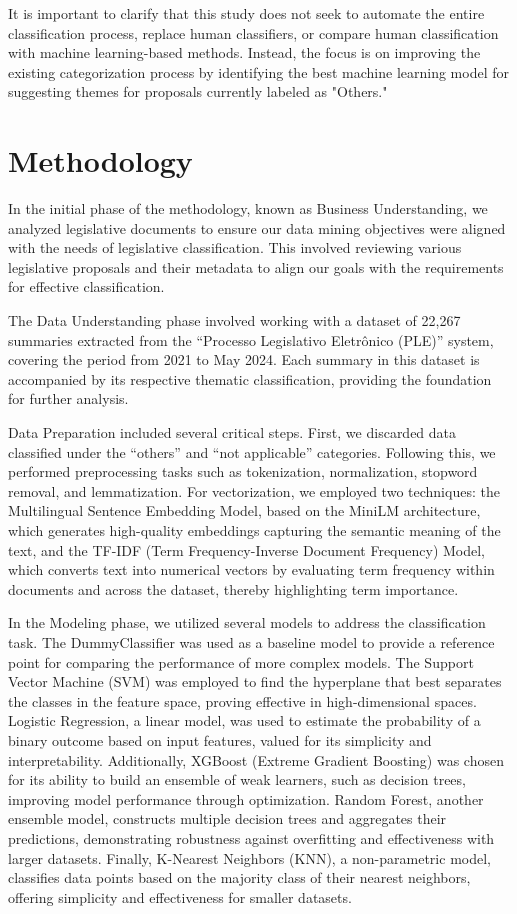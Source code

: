 \documentclass[12pt]{article}
\begin{document}
It is important to clarify that this study does not seek to automate the entire classification process, replace human classifiers, or compare human classification with machine learning-based methods. Instead, the focus is on improving the existing categorization process by identifying the best machine learning model for suggesting themes for proposals currently labeled as "Others."

\section{Methodology}

In the initial phase of the methodology, known as Business Understanding, we analyzed legislative documents to ensure our data mining objectives were aligned with the needs of legislative classification. This involved reviewing various legislative proposals and their metadata to align our goals with the requirements for effective classification.

The Data Understanding phase involved working with a dataset of 22,267 summaries extracted from the “Processo Legislativo Eletrônico (PLE)” system, covering the period from 2021 to May 2024. Each summary in this dataset is accompanied by its respective thematic classification, providing the foundation for further analysis.

Data Preparation included several critical steps. First, we discarded data classified under the “others” and “not applicable” categories. Following this, we performed preprocessing tasks such as tokenization, normalization, stopword removal, and lemmatization. For vectorization, we employed two techniques: the Multilingual Sentence Embedding Model, based on the MiniLM architecture, which generates high-quality embeddings capturing the semantic meaning of the text, and the TF-IDF (Term Frequency-Inverse Document Frequency) Model, which converts text into numerical vectors by evaluating term frequency within documents and across the dataset, thereby highlighting term importance.

In the Modeling phase, we utilized several models to address the classification task. The DummyClassifier was used as a baseline model to provide a reference point for comparing the performance of more complex models. The Support Vector Machine (SVM) was employed to find the hyperplane that best separates the classes in the feature space, proving effective in high-dimensional spaces. Logistic Regression, a linear model, was used to estimate the probability of a binary outcome based on input features, valued for its simplicity and interpretability. Additionally, XGBoost (Extreme Gradient Boosting) was chosen for its ability to build an ensemble of weak learners, such as decision trees, improving model performance through optimization. Random Forest, another ensemble model, constructs multiple decision trees and aggregates their predictions, demonstrating robustness against overfitting and effectiveness with larger datasets. Finally, K-Nearest Neighbors (KNN), a non-parametric model, classifies data points based on the majority class of their nearest neighbors, offering simplicity and effectiveness for smaller datasets.
\end{document}
